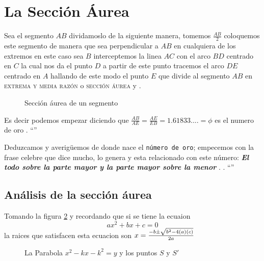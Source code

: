 \section{La Sección Áurea}

Sea el segmento $AB$ dividamoslo de la siguiente manera, tomemos $\frac{AB}{2}$ coloquemos este segmento de manera que sea perpendicular a $AB$ en cualquiera de los extremos en este caso sea $B$ interceptemos la linea $AC$ con el arco $BD$ centrado en $C$ la cual nos da el punto $D$ a partir de este punto tracemos el arco $DE$ centrado en $A$ hallando de este modo el punto $E$ que divide al segmento $AB$ en \textsc{extrema y media razón} o \textsc{sección áurea} \cite{Phillips} y \cite{variablei}.

\begin{figure}[!ht]
	\begin{center}
	\end{center}
	\caption{Sección áurea de un segmento}
	\label{Hw}
\end{figure}

Es decir podemos empezar diciendo que $\frac{AB}{AE}=\frac{AE}{EB}=1.61833....=\phi $ es el numero de oro \cite{surhone2010shapiro}  \cite{jackson2012research}. ``''

Deduzcamos y averigüemos de donde nace el \texttt{número de oro}; empecemos con la frase celebre que dice mucho, lo genera y esta relacionado con este  número: \textbf{\textit{El todo sobre la parte mayor y la parte mayor sobre la menor}} \cite{Heinz}. \cite{hilbert2020geometry}. ``''

\subsection{Análisis de la sección áurea}
Tomando la figura \ref{ec1} y recordando que si se tiene la ecuaion $$ax^2+bx+c=0$$ la raices que satisfacen esta ecuacion son $x=\frac{-b\pm\sqrt{b^2-4\left(a\right)\left(c\right)}}{2a}$


\begin{figure}[!ht]
	\begin{center}

	\end{center}
	\caption{La Parabola $x^2-kx-k^2=y$ y los puntos $S$ y $S'$}\label{ec1}
\end{figure}


